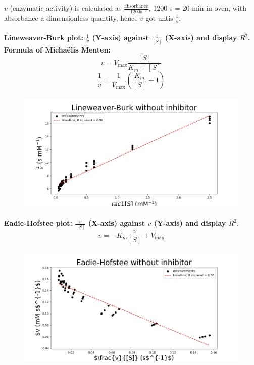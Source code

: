 \documentclass[a4paper,12pt]{article}
\begin{document}
$v$ (enzymatic activity) is calculated as $\frac{\text{absorbance}}{1200 \text{s}}$, 1200 s = 20 min in oven, with absorbance a dimensionless quantity, hence $v$ got untis $\frac{1}{\text{s}}$.\\

\paragraph{Lineweaver-Burk plot: $\frac{1}{v}$ (Y-axis) against $\frac{1}{[S]}$ (X-axis) and display $R^2$. 
Formula of Michaëlis Menten:\[v=V_{\text{max}}\frac{[S]}{K_m+[S]}\] \[\frac{1}{v}=\frac{1}{V_{\text{max}}}\left(\frac{K_m}{[S]}+1\right)\]}

\begin{figure}[htb]
    \includegraphics[scale=0.4]{fig2_2.png}
    \centering
\end{figure}

\paragraph{Eadie-Hofstee plot: $\frac{v}{[S]}$ (X-axis) against $v$ (Y-axis) and display $R^2$. \[v=-K_m\frac{v}{[S]}+V_{\text{max}}\]}

\begin{figure}[htb]
    \includegraphics[scale=0.4]{fig2_3.png}
    \centering
\end{figure}
\end{document}
